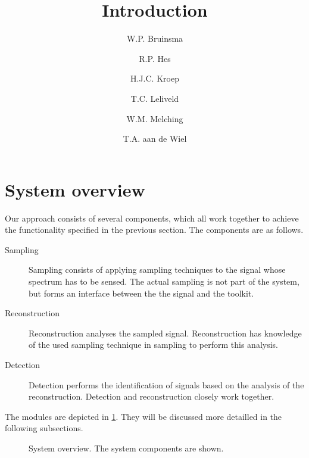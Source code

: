 \documentclass[a4paper, openany, oneside]{memoir}
\title{Introduction}
\author{W.P. Bruinsma \and R.P. Hes \and H.J.C. Kroep \and T.C. Leliveld \and W.M. Melching \and T.A. aan de Wiel}
\begin{document}
\section{System overview}
Our approach consists of several components, which all work together to achieve the functionality specified in the previous section. The components are as follows.

\begin{description}
    \item[Sampling] Sampling consists of applying sampling techniques to the signal whose spectrum has to be sensed. The actual sampling is not part of the system, but forms an interface between the the signal and the toolkit.
    \item[Reconstruction] Reconstruction analyses the sampled signal. Reconstruction has knowledge of the used sampling technique in sampling to perform this analysis.
    \item[Detection] Detection performs the identification of signals based on the analysis of the reconstruction. Detection and reconstruction closely work together.
\end{description}

The modules are depicted in \cref{fig:overview}. They will be discussed more detailled in the following subsections.
\begin{figure}
    \centering
    \caption{System overview. The system components are shown.}
    \label{fig:overview}
\end{figure}
\end{document}
